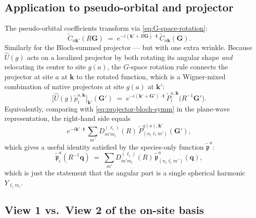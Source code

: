 \documentclass[11pt,a4paper]{article}
\newcommand{\kk}{\mathbf{k}}
\newcommand{\GG}{\mathbf{G}}
\newcommand{\tvec}{\mathbf{t}}
\newcommand{\Uhat}{\hat{U}}
\begin{document}
\subsection{Application to pseudo-orbital and projector}

The pseudo-orbital coefficients transform via \eqref{eq:G-space-rotation}:
\begin{equation}
\tilde C_{n\kk'}(R\GG) \;=\; e^{-i(\kk'+R\GG)\cdot\tvec}\,\tilde C_{n\kk}(\GG).
\label{eq:pseudo-PW-symm}
\end{equation}
Similarly for the Bloch-summed projector --- but with one extra wrinkle.
Because $\Uhat(g)$ acts on a localized projector by both rotating its angular
shape \emph{and} relocating its center to site $g(a)$, the $G$-space rotation
rule connects the projector at site $a$ at $\kk$ to the rotated function,
which is a Wigner-mixed combination of native projectors at site $g(a)$ at
$\kk'$:
\begin{equation}
\bigl[\Uhat(g)\tilde p_i^{a,\kk}\bigr]_{\kk'}\!(\GG')
  \;=\; e^{-i(\kk'+\GG')\cdot\tvec}\,\tilde P_i^{a,\kk}\bigl(R^{-1}\GG'\bigr).
\label{eq:projector-PW-rotation}
\end{equation}
Equivalently, comparing with \eqref{eq:projector-bloch-symm} in the plane-wave
representation, the right-hand side equals
\begin{equation}
e^{-i\kk'\cdot\tvec}\,\sum_{m'} D^{(\ell_i)}_{m' m_i}(R)\,
      \tilde P^{g(a),\kk'}_{(n_i\ell_i m')}(\GG'),
\end{equation}
which gives a useful identity satisfied by the species-only function
$\tilde{\mathfrak p}^a$:
\begin{equation}
\tilde{\mathfrak p}^a_i(R^{-1}\mathbf{q})
  \;=\; \sum_{m'} D^{(\ell_i)}_{m' m_i}(R)\,
        \tilde{\mathfrak p}^a_{(n_i\ell_i m')}(\mathbf{q}),
\end{equation}
which is just the statement that the angular part is a single spherical
harmonic $Y_{\ell_i m_i}$.

\subsection{View 1 vs.~View 2 of the on-site basis}
\end{document}

